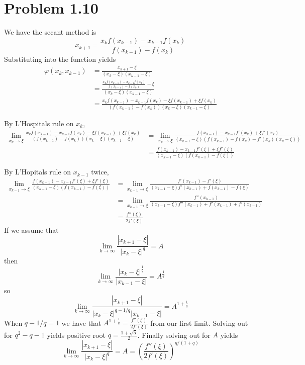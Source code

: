 \documentclass{article}
\begin{document}
\section*{Problem 1.10}
We have the secant method is 
\[
	x_{k+1} = \frac{x_kf(x_{k-1})-x_{k-1}f(x_k)}{f(x_{k-1})-f(x_k)}
\]
Substituting into the function yields
\begin{align*}
	\varphi(x_k, x_{k-1}) &= \frac{x_{k+1}-\xi}{(x_k-\xi)(x_{k-1}-\xi)} \\
	&=\frac{\frac{x_kf(x_{k-1})-x_{k-1}f(x_k)}{f(x_{k-1})-f(x_k)}-\xi}{(x_k-\xi)(x_{k-1}-\xi)} \\
	&= \frac{x_kf(x_{k-1})-x_{k-1}f(x_k) - \xi f(x_{k-1}) +\xi f(x_k)}{(f(x_{k-1})-f(x_k))(x_k-\xi)(x_{k-1}-\xi)}
\end{align*}

By L'Hospitals rule on $x_k$,
\begin{align*}
	\lim_{x_k \to \xi}\frac{x_kf(x_{k-1})-x_{k-1}f(x_k) - \xi f(x_{k-1}) +\xi f(x_k)}{(f(x_{k-1})-f(x_k))(x_k-\xi)(x_{k-1}-\xi)} &= 
	\lim_{x_k \to \xi}\frac{f(x_{k-1})-x_{k-1}f'(x_k) +\xi f'(x_k)}{(x_{k-1}-\xi)(f(x_{k-1})-f(x_k) - f'(x_k)(x_k - \xi))} \\
	&= \frac{f(x_{k-1})-x_{k-1}f'(\xi) +\xi f'(\xi)}{(x_{k-1}-\xi)(f(x_{k-1})-f(\xi))} 
\end{align*}
	

By L'Hopitals rule on $x_{k-1}$ twice,
\begin{align*}
	\lim_{x_{k-1} \to \xi} \frac{f(x_{k-1})-x_{k-1}f'(\xi) +\xi f'(\xi)}{(x_{k-1}-\xi)(f(x_{k-1})-f(\xi))}  
	&= \lim_{x_{k-1} \to \xi} \frac{f'(x_{k-1})-f'(\xi)}{(x_{k-1}-\xi)f'(x_{k-1}) + f(x_{k-1})-f(\xi)} \\
	&= \lim_{x_{k-1} \to \xi} \frac{f''(x_{k-1})}{(x_{k-1}-\xi)f''(x_{k-1}) +  f'(x_{k-1}) + f'(x_{k-1})} \\
	&= \frac{f''(\xi)}{2f'(\xi)}
\end{align*}
If we assume that 
\[
	\lim_{k \to \infty} \frac{|x_{k+1}-\xi|}{|x_k - \xi|^q} = A
\]
then
\[
	\lim_{k \to \infty} \frac{|x_k-\xi|^{\frac{1}{q}}}{|x_{k-1} - \xi|} = A^{\frac{1}{q}}
\]
so 
\[
	\lim_{k \to \infty} \frac{|x_{k+1}-\xi|}{|x_k - \xi|^{q-1/q}|x_{k-1} - \xi|} = A^{1+\frac{1}{q}}
\]
When $q - 1/q = 1$ we have that $A^{1+\frac{1}{q}} = \frac{f''(\xi)}{2f'(\xi)}$ from our first limit.
Solving out for $q^2 - q - 1$ yields positive root $q = \frac{1 +\sqrt{5}}{2}$.
Finally solving out for $A$ yields 
\[
	\lim_{k \to \infty} \frac{|x_{k+1}-\xi|}{|x_k - \xi|^q} = A = \left(\frac{f''(\xi)}{2f'(\xi)}\right)^{q/(1+q)}
\]
	
\end{document}

